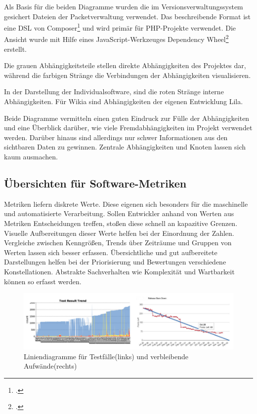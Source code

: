 Als Basis für die beiden Diagramme wurden die im Versionsverwaltungssystem gesichert Dateien der Packetverwaltung verwendet. Das beschreibende Format ist eine DSL von Composer\footcite{composer-json} und wird primär für PHP-Projekte verwendet. Die Ansicht wurde mit Hilfe eines JavaScript-Werkzeuges \glqq Dependency Wheel\grqq{}\footcite{composer-dependency-wheel} erstellt.

Die grauen Abhängigkeitsteile stellen direkte Abhängigkeiten des Projektes dar, während die farbigen Stränge die Verbindungen der Abhängigkeiten visualisieren.

In der Darstellung der Individualsoftware, sind die roten Stränge interne Abhängigkeiten. Für Wikia sind Abhängigkeiten der eigenen Entwicklung Lila.

Beide Diagramme vermitteln einen guten Eindruck zur Fülle der Abhängigkeiten und eine Überblick darüber, wie viele Fremdabhängigkeiten im Projekt verwendet werden. Darüber hinaus sind allerdings nur schwer Informationen aus den sichtbaren Daten zu gewinnen. Zentrale Abhängigkeiten und Knoten lassen sich kaum ausmachen.

\subsection{Übersichten für Software-Metriken}

Metriken liefern diskrete Werte. Diese eigenen sich besonders für die maschinelle und automatisierte Verarbeitung. Sollen Entwickler anhand von Werten aus Metriken Entscheidungen treffen, stoßen diese schnell an kapazitive Grenzen. Visuelle Aufbereitungen dieser Werte helfen bei der Einordnung der Zahlen. Vergleiche zwischen Kenngrößen, Trends über Zeiträume und Gruppen von Werten lassen sich besser erfassen. Übersichtliche und gut aufbereitete Darstellungen helfen bei der Priorisierung und Bewertungen verschiedene Konstellationen. Abstrakte Sachverhalten wie Komplexität und Wartbarkeit können so erfasst werden.

\begin{figure}[htbp]
  \includegraphics[width=\textwidth, height=\textheight, keepaspectratio]
    {resources/line-chart.pdf}
  \caption{Liniendiagramme für Testfälle(links) und verbleibende Aufwände(rechts)}
  \label{line-chart}
\end{figure}
